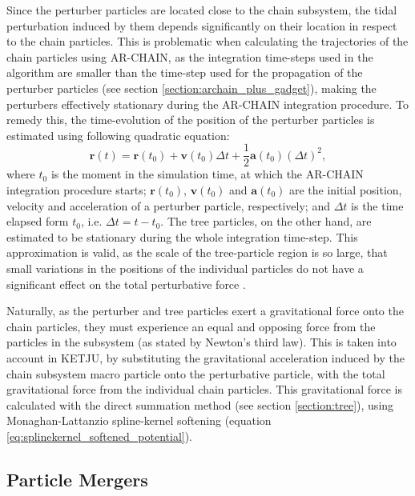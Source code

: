 \documentclass[english, twoside]{HYgradu}
\begin{document}
Since the perturber particles are located close to the chain subsystem, the tidal perturbation induced by them depends significantly on their location in respect to the chain particles. This is problematic when calculating the trajectories of the chain particles using AR-CHAIN, as the integration time-steps used in the algorithm are smaller than the time-step used for the propagation of the perturber particles (see section \ref{section:archain_plus_gadget}), making the perturbers effectively stationary during the AR-CHAIN integration procedure. To remedy this, the time-evolution of the position of the perturber particles is estimated using following quadratic equation:
\begin{equation}
\mathbf{r}(t) = \mathbf{r}(t_0) + \mathbf{v}(t_0)\Delta t + \frac{1}{2}\mathbf{a}(t_0) (\Delta t)^2,
\end{equation}
where $t_0$ is the moment in the simulation time, at which the AR-CHAIN integration procedure starts; $\mathbf{r}(t_0)$, $\mathbf{v}(t_0)$ and $\mathbf{a}(t_0)$ are the initial position, velocity and acceleration of a perturber particle, respectively; and $\Delta t$ is the time elapsed form $t_0$, i.e. $\Delta t = t - t_0$. The tree particles, on the other hand, are estimated to be stationary during the whole integration time-step. This approximation is valid, as the scale of the tree-particle region is so large, that small variations in the positions of the individual particles do not have a significant effect on the total perturbative force \citep{Ahmad1973}.

Naturally, as the perturber and tree particles exert a gravitational force onto the chain particles, they must experience an equal and opposing force from the particles in the subsystem (as stated by Newton's third law). This is taken into account in KETJU, by substituting the gravitational acceleration induced by the chain subsystem macro particle onto the perturbative particle, with the total gravitational force from the individual chain particles. This gravitational force is calculated with the direct summation method (see section \ref{section:tree}), using Monaghan-Lattanzio spline-kernel softening (equation \ref{eq:splinekernel_softened_potential}).

\subsection{Particle Mergers}
\end{document}
